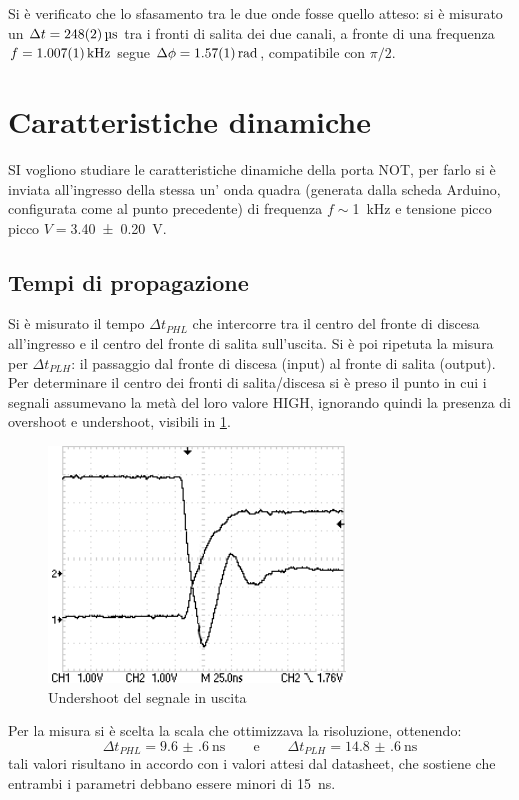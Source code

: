 \documentclass[a4paper,11pt]{article}
\begin{document}
Si è verificato che lo sfasamento tra le due onde fosse quello atteso: si è misurato un $\Delta t=\SI{248 \pm 2}{\micro\second}$ tra i fronti di salita dei due canali, a fronte di una frequenza $f=\SI{1.007 \pm 0.001}{\kilo \hertz}$ segue $\Delta \phi=\SI{1.57 \pm 0.01 }{\radian}$, compatibile con $\pi/2$.
\section{Caratteristiche dinamiche}
SI vogliono studiare le caratteristiche dinamiche della porta NOT, per farlo si è inviata all'ingresso della stessa un' onda quadra (generata dalla scheda Arduino, configurata come al punto precedente) di frequenza  $f\sim$\SI{1}{\kilo \hertz} e tensione picco picco $V=$\SI{3.40 \pm 0.20}{\volt}.

\subsection{Tempi di propagazione}
Si è misurato il tempo $\Delta t_{PHL}$ che intercorre tra il centro del fronte di discesa all'ingresso e il centro del fronte di salita sull'uscita. Si è poi ripetuta la misura per $\Delta t_{PLH}$: il passaggio dal fronte di discesa (input) al fronte di salita (output).
Per determinare il centro dei fronti di salita/discesa si è preso il punto in cui i segnali assumevano la metà del loro valore HIGH, ignorando quindi la presenza di overshoot e undershoot, visibili in \figurename{ \ref{f:ripple}}.

\begin{figure}[H]
	\centering
	\includegraphics[scale=1]{undershoot_lh.png}
	\caption{Undershoot del segnale in uscita}
	\label{f:ripple}
\end{figure}
\noindent Per la misura si è scelta la scala che ottimizzava la risoluzione, ottenendo:
$$\Delta t_{PHL}=\SI{9.6(6)}{\nano \second} \qquad \text{e} \qquad \Delta t_{PLH}=\SI{14.8(6)}{\nano \second}$$
tali valori risultano in accordo con i valori attesi dal datasheet, che sostiene che entrambi i parametri debbano essere minori di \SI{15}{\nano \second}.
\end{document}
